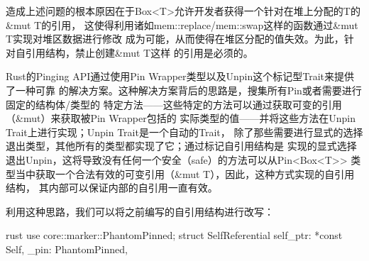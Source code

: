 
造成上述问题的根本原因在于Box<T>允许开发者获得一个针对在堆上分配的T的\&mut T的引用，
这使得利用诸如mem::replace/mem::swap这样的函数通过\&mut T实现对堆区数据进行修改
成为可能，从而使得在堆区分配的值失效。为此，针对自引用结构，禁止创建\&mut T这样
的引用是必须的。

Rust的Pinging API通过使用Pin Wrapper类型以及Unpin这个标记型Trait来提供了一种可靠
的解决方案。这种解决方案背后的思路是，搜集所有Pin或者需要进行固定的结构体/类型的
特定方法——这些特定的方法可以通过获取可变的引用（\&mut）来获取被Pin Wrapper包括的
实际类型的值——并将这些方法在Unpin Trait上进行实现；Unpin Trait是一个自动的Trait，
除了那些需要进行显式的选择退出类型，其他所有的类型都实现了它；通过标记自引用结构是
实现的显式选择退出Unpin，这将导致没有任何一个安全（safe）的方法可以从Pin<Box<T>>
类型当中获取一个合法有效的可变引用（\&mut T），因此，这种方式实现的自引用结构，
其内部可以保证内部的自引用一直有效。

利用这种思路，我们可以将之前编写的自引用结构进行改写：
\begin{code-block}{rust}
use core::marker::PhantomPinned;
struct SelfReferential {
    self_ptr: *const Self,
    _pin: PhantomPinned,
}
\end{code-block}

